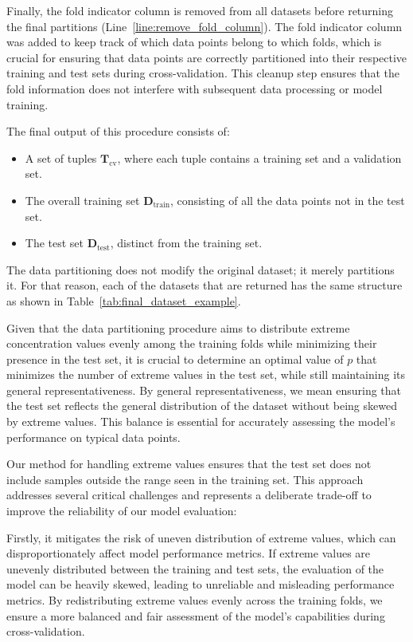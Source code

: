Finally, the fold indicator column is removed from all datasets before returning the final partitions (Line~\ref{line:remove_fold_column}).
The fold indicator column was added to keep track of which data points belong to which folds, which is crucial for ensuring that data points are correctly partitioned into their respective training and test sets during cross-validation. 
This cleanup step ensures that the fold information does not interfere with subsequent data processing or model training.

The final output of this procedure consists of:
\begin{itemize}
    \item A set of tuples \(\mathbf{T}_\text{cv}\), where each tuple contains a training set and a validation set.
    \item The overall training set \(\mathbf{D}_\text{train}\), consisting of all the data points not in the test set.
    \item The test set \(\mathbf{D}_\text{test}\), distinct from the training set.
\end{itemize}

The data partitioning does not modify the original dataset; it merely partitions it.
For that reason, each of the datasets that are returned has the same structure as shown in Table~\ref{tab:final_dataset_example}.

Given that the data partitioning procedure aims to distribute extreme concentration values evenly among the training folds while minimizing their presence in the test set, it is crucial to determine an optimal value of $p$ that minimizes the number of extreme values in the test set, while still maintaining its general representativeness.
By general representativeness, we mean ensuring that the test set reflects the general distribution of the dataset without being skewed by extreme values.
This balance is essential for accurately assessing the model's performance on typical data points.

Our method for handling extreme values ensures that the test set does not include samples outside the range seen in the training set.
This approach addresses several critical challenges and represents a deliberate trade-off to improve the reliability of our model evaluation:

Firstly, it mitigates the risk of uneven distribution of extreme values, which can disproportionately affect model performance metrics.
If extreme values are unevenly distributed between the training and test sets, the evaluation of the model can be heavily skewed, leading to unreliable and misleading performance metrics.
By redistributing extreme values evenly across the training folds, we ensure a more balanced and fair assessment of the model's capabilities during cross-validation.

